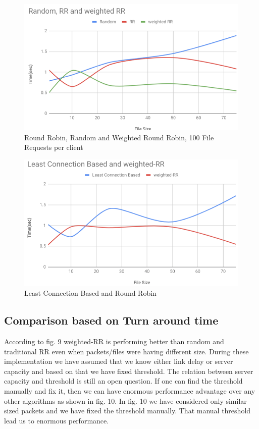 \documentclass[letterpaper, 10 pt, conference]{IEEEtran}
\begin{document}
\begin{figure}[ht!]
\centering
\includegraphics[width=\linewidth]{2.png}
\caption{Round Robin, Random and Weighted Round Robin, 100 File Requests per client \label{fig:7}}
\end{figure}

\begin{figure}[ht!]
\centering
\includegraphics[width=\linewidth]{5.png}
\caption{Least Connection Based and Round Robin \label{fig:9}}
\end{figure}

\subsection{Comparison based on Turn around time}

According to fig. 9 weighted-RR is performing better than random and traditional RR even when packets/files were having different size. During these implementation we have assumed that we know either link delay or server capacity and based on that we have fixed threshold. The relation between server capacity and threshold is still an open question. If one can find the threshold manually and fix it, then we can have enormous performance advantage over any other algorithms as shown in fig. 10. In fig. 10 we have considered only similar sized packets and we have fixed the threshold manually. That manual threshold lead us to enormous performance.
\end{document}
